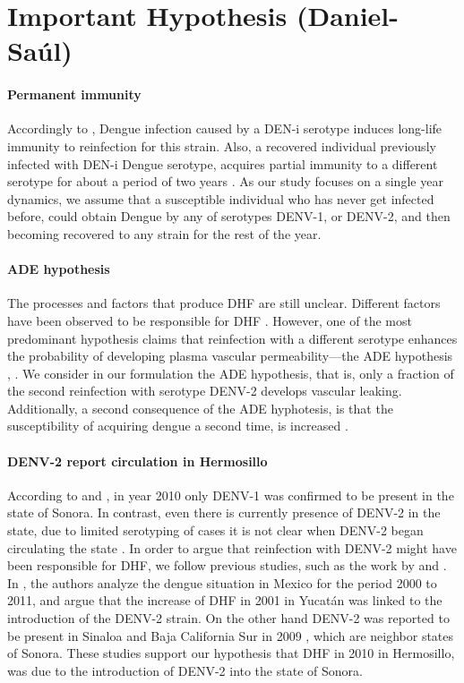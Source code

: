 \section*{Important Hypothesis (Daniel-Saúl)}
    \paragraph{Permanent immunity}
    Accordingly to \cite{WHO}, Dengue infection caused by a DEN-i serotype induces long-life immunity to reinfection for this strain. Also,  a recovered individual previously infected with DEN-i Dengue serotype, acquires partial immunity to a different serotype for about a period of two years \cite{Reich2013}. As our study focuses on a single year dynamics, we assume that a susceptible individual who has never get infected before, could obtain Dengue by any of serotypes DENV-1, or DENV-2, and then becoming recovered to any strain for the rest of the year. 
    
    \paragraph{ADE hypothesis}
    The processes and factors that produce \ac{DHF} are still unclear. Different factors have
    been observed to be responsible for DHF \cite{Martina2009}. However, one of the most predominant hypothesis claims that reinfection with a different serotype enhances the probability of developing plasma vascular permeability---the \ac{ADE} hypothesis \citep[see, e.g.][p. 295]{Halstead1992}, \cite{Guzman2013}. We consider in our formulation the ADE hypothesis, that 
    is, only a fraction of the second reinfection with serotype \ac{DENV-2} develops vascular leaking. Additionally, a second consequence of the ADE hyphotesis, is that the susceptibility of acquiring dengue a second time, is increased \cite{Recker2009}. \\
%
    \paragraph{\ac{DENV-2} report circulation in Hermosillo}
    According to \cite{Vazquez2011} and \cite{Reyes2017}, in year 2010 only DENV-1 was confirmed to be present in the state of Sonora. In contrast, even there is currently presence of DENV-2 in the state, due to limited serotyping of cases it is not clear when DENV-2 began circulating the state \cite{Reyes2017}. In order to argue that reinfection with DENV-2 might have been responsible for DHF, we follow previous studies, such as the work by \cite{Gomez2014} and \cite{Vazquez2011}. In \cite{Gomez2014}, the authors analyze the dengue situation in Mexico for the period 2000 to 2011, and argue that the increase of DHF in 2001 in Yucat\'an was linked to the introduction of the DENV-2 strain. 
    On the other hand DENV-2 was reported to be present in Sinaloa and Baja California Sur in 2009 \cite{Vazquez2011}, which are neighbor states of Sonora. These studies support our hypothesis that DHF in 2010 in Hermosillo, was due to the introduction of DENV-2 into the state of Sonora. 
    
